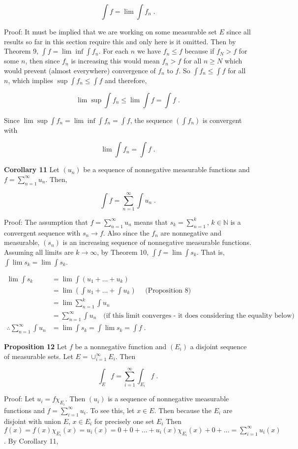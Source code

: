 \documentclass[a4paper]{article}
\begin{document}
$$\int f = \lim \int f_n \;.$$ 

Proof: It must be implied that we are working on some measurable set $E$ since all results so far in this section require this and only here is it omitted. Then by Theorem 9, $\int f = \lim \inf \int f_n$. For each $n$ we have $f_n \leq f$ because if $f_N > f$ for some $n$, then since $f_n$ is increasing this would mean $f_n > f$ for all $n \geq N$ which would prevent (almost everywhere) convergence of $f_n$ to $f$. So $\int f_n \leq \int f$ for all $n$, which implies $\sup \int f_n \leq \int f$ and therefore,

$$\lim \sup \int f_n \leq \lim \int f = \int f \;.$$

Since $\lim \sup \int f_n = \lim \inf \int f_n = \int f$, the sequence $(\int f_n)$ is convergent with

$$\lim \int f_n = \int f \;.$$

{\bf Corollary 11} Let $(u_n)$ be a sequence of nonnegative measurable functions and $f = \sum_{n=1}^\infty u_n$. Then,

$$\int f = \sum_{n=1}^\infty \int u_n \;.$$

Proof: The assumption that $f = \sum_{n=1}^\infty u_n$ means that $s_k = \sum_{n=1}^k$, $k \in \mathbb{N}$ is a convergent sequence with $s_n \rightarrow f$. Also since the $f_n$ are nonnegative and measurable, $(s_n)$ is an increasing sequence of nonnegative measurable functions. Assuming all limits are $ k\rightarrow \infty$, by Theorem 10, $\int f = \lim \int s_k$. That is, $\int \lim s_k = \lim \int s_k$.

\begin{align*}
\lim \int s_k &= \lim \int (u_1 + ... + u_k) \\
& = \lim (\int u_1 + ... + \int u_k) \quad \text{ (Proposition 8)} \\
&= \lim \sum_{n=1}^k \int u_n \\
&= \sum_{n=1}^\infty \int u_n \quad \text{(if this limit converges - it does considering the equality below)} \\
\therefore \sum_{n=1}^\infty \int u_n &= \lim \int s_k = \int \lim s_k = \int f \;.
\end{align*}

{\bf Proposition 12} Let $f$ be a nonnegative function and $(E_i)$ a disjoint sequence of measurable sets. Let $E = \cup_{i=1}^\infty E_i$. Then 

$$\int_E f = \sum_{i=1}^\infty \int_{E_i} f \;.$$

Proof: Let $u_i = f\chi_{E_i}$. Then $(u_i)$ is a sequence of nonnegative measurable functions and $f = \sum_{i=1}^\infty u_i$. To see this, let $x \in E$. Then because the $E_i$ are disjoint with union $E$, $x \in E_i$ for precisely one set $E_i$ Then $f(x) = f(x) \chi_{E_i}(x) = u_i(x) = 0 + 0 + ...+ u_i(x) \chi_{E_i}(x) + 0 + ... = \sum_{i=1}^\infty u_i(x)$. By Corollary 11,
\end{document}
